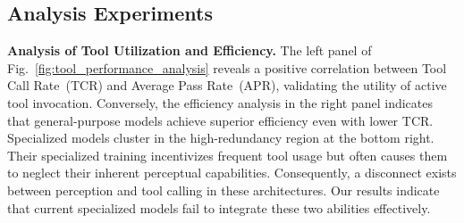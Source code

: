 \documentclass[runningheads]{llncs}
\begin{document}
\subsection{Analysis Experiments}\label{sec:tool_use_analysis}
\noindent \textbf{Analysis of Tool Utilization and Efficiency.} The left panel of Fig.~\ref{fig:tool_performance_analysis} reveals a positive correlation between Tool Call Rate~(TCR) and Average Pass Rate~(APR), validating the utility of active tool invocation. Conversely, the efficiency analysis in the right panel indicates that general-purpose models achieve superior efficiency even with lower TCR. Specialized models cluster in the high-redundancy region at the bottom right. Their specialized training incentivizes frequent tool usage but often causes them to neglect their inherent perceptual capabilities. Consequently, a disconnect exists between perception and tool calling in these architectures. Our results indicate that current specialized models fail to integrate these two abilities effectively.



\end{document}
